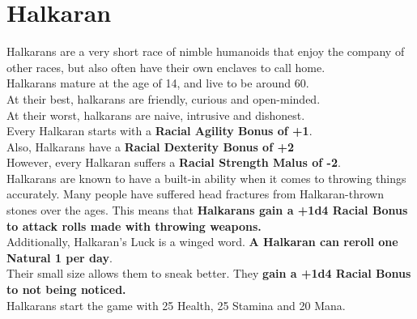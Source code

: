\section{Halkaran}\label{race:halkara}
Halkarans are a very short race of nimble humanoids that enjoy the company of other races, but also often have their own enclaves to call home.\\
Halkarans mature at the age of 14, and live to be around 60.\\
At their best, halkarans are friendly, curious and open-minded.\\
At their worst, halkarans are naive, intrusive and dishonest.\\
Every Halkaran starts with a \textbf{Racial Agility Bonus of +1}.\\
Also, Halkarans have a \textbf{Racial Dexterity Bonus of +2}\\
However, every Halkaran suffers a \textbf{Racial Strength Malus of -2}.\\
Halkarans are known to have a built-in ability when it comes to throwing things accurately.
Many people have suffered head fractures from Halkaran-thrown stones over the ages.
This means that \textbf{Halkarans gain a +1d4 Racial Bonus to attack rolls made with throwing weapons.}\\
Additionally, Halkaran's Luck is a winged word. \textbf{A Halkaran can reroll one Natural 1 per day}.\\
Their small size allows them to sneak better.
They \textbf{gain a +1d4 Racial Bonus to not being noticed.}\\
Halkarans start the game with 25 Health, 25 Stamina and 20 Mana.